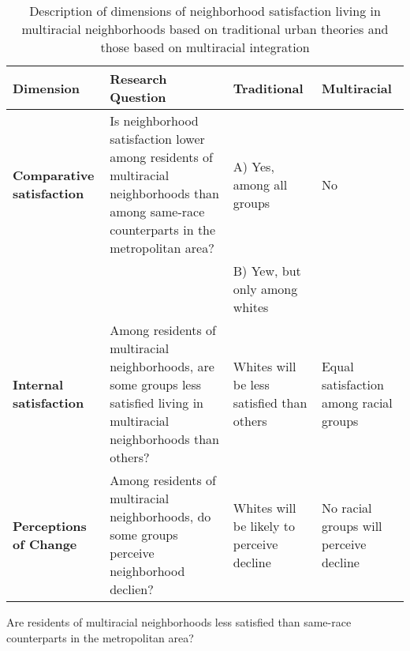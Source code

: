 


\begin{sidewaystable}
\caption{Description of dimensions of neighborhood satisfaction living in multiracial neighborhoods based on traditional urban theories and those based on multiracial integration}
\label{tab:theory}
\begin{tabular}{L{2in}L{2in}L{2in}L{2in}}
\textbf{Dimension} & \textbf{Research Question} & \textbf{Traditional} & \textbf{Multiracial} \\\toprule
\textbf{Comparative satisfaction} & Is neighborhood satisfaction lower among residents of multiracial neighborhoods than among same-race counterparts in the metropolitan area? & A) Yes, among all groups & No \\
&  & B) Yew, but only among whites & \\\midrule
\textbf{Internal satisfaction} & Among residents of multiracial neighborhoods, are some groups less satisfied living in multiracial neighborhoods than others? & Whites will be less satisfied than others & Equal satisfaction among racial groups \\\midrule
\textbf{Perceptions of Change} & Among residents of multiracial neighborhoods, do some groups perceive neighborhood declien? & Whites will be likely to perceive decline & No racial groups will perceive decline \\\bottomrule
\end{tabular}
\end{sidewaystable}
Are residents of multiracial neighborhoods less satisfied than same-race counterparts in the metropolitan area?